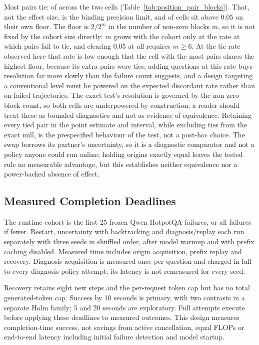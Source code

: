 \documentclass{article}
\begin{document}
Most pairs tie: \PairTiedPairs{} of \PairPairs{} across the two cells
(Table~\ref{tab:position_pair_blocks}). That, not the effect size, is the
binding precision limit, and \PairBlockedCells{} of \PairTotalCells{} cells
sit above 0.05 on their own floor. The floor is $2/2^{m}$ in the number of
non-zero blocks $m$, so it is not fixed by the cohort size directly: $m$ grows
with the cohort only at the rate at which pairs fail to tie, and clearing 0.05
at all requires $m\geq6$. At the tie rate observed here that rate is low
enough that the cell with the most pairs shares the highest floor, because its
extra pairs were ties; adding questions at this rate buys resolution far more
slowly than the failure count suggests, and a design targeting a conventional
level must be powered on the expected discordant rate rather than on failed
trajectories. The exact test's resolution is
governed by the non-zero block count, so both cells are underpowered by
construction: a reader should treat these as bounded diagnostics and not as
evidence of equivalence. Retaining every tied pair in the point estimate and
interval, while excluding ties from the exact null, is the prespecified
behaviour of the test, not a post-hoc choice. The swap borrows its partner's
uncertainty, so it is a diagnostic comparator and not a policy anyone could run
online; holding origins exactly equal leaves the tested rule no measurable
advantage, but this establishes neither equivalence nor a power-backed absence
of effect.

\subsection{Measured Completion Deadlines}
The runtime cohort is the first 25 frozen Qwen HotpotQA failures, or all
failures if fewer. Restart, uncertainty with backtracking and diagnosis/replay
each run separately with three seeds in shuffled order, after model warmup
and with prefix caching disabled. Measured time includes origin acquisition,
prefix replay and recovery. Diagnosis acquisition is measured once per
question and charged in full to every diagnosis-policy attempt; its latency
is not remeasured for every seed.

Recovery retains eight new steps and the per-request token cap but has no
total generated-token cap. Success by 10 seconds is primary, with two
contrasts in a separate Holm family; 5 and 20 seconds are exploratory.
Full attempts execute before applying these deadlines to measured outcomes.
This design measures completion-time success, not savings from active
cancellation, equal FLOPs or end-to-end latency including initial failure
detection and model startup.
\end{document}
